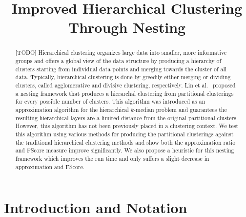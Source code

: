 \documentclass[conference, 10pt, final]{IEEEtran}
\begin{document}
 

\title{Improved Hierarchical Clustering Through Nesting}


\author{
}


\maketitle

\begin{abstract}
[TODO]
Hierarchical clustering organizes large data into smaller, more informative groups and offers a global view of the data structure by producing a hierarchy of clusters starting from individual data points and merging towards the cluster of all data. Typically, hierarchical clustering is done by greedily either merging or dividing clusters, called agglomerative and divisive clustering, respectively. Lin et al.~\cite{Lin} proposed a nesting framework that produces a hierarchal clustering from partitional clusterings for every possible number of clusters. This algorithm was introduced as an approximation algorithm for the hierarchical $k$-median problem and guarantees the resulting hierarchical layers are a limited distance from the original partitional clusters. However, this algorithm has not been previously placed in a clustering context. We test this algorithm using various methods for producing the partitional clusterings against the traditional hierarchical clustering methods and show both the approximation ratio and FScore measure improve significantly. We also propose a heuristic for this nesting framework which improves the run time and only suffers a slight decrease in approximation and FScore.
\end{abstract}


\section{Introduction and Notation}
\end{document}
